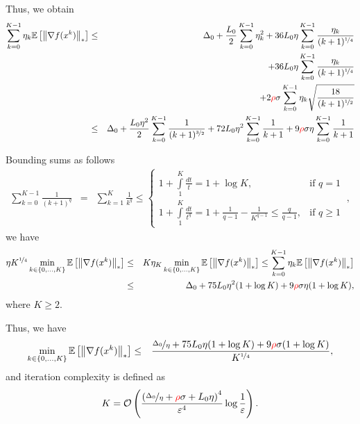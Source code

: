 \documentclass{article}
\begin{document}
Thus, we obtain 
\begin{eqnarray*}
    \sum_{k=0}^{K-1} \eta_k {\mathbb{E}}\left[\left\| \nabla f(x^k) \right\|_*\right] &\le& \Delta_0  +\frac{L_0}{2}\sum^{K-1}_{k=0}\eta_k^2 + 36L_0\eta\sum^{K-1}_{k=0}\frac{\eta_k}{(k+1)^{\nicefrac{1}{4}}}\\
    && + 36L_0\eta\sum^{K-1}_{k=0}\frac{\eta_k}{(k+1)^{\nicefrac{1}{4}}}\\
    && + 2{\color{red} \rho} \sigma\sum^{K-1}_{k=0}\eta_k\sqrt{\frac{18}{(k+1)^{\nicefrac{1}{2}}}}\\
    &\le& \Delta_0  +\frac{L_0\eta^2}{2}\sum^{K-1}_{k=0}\frac{1}{(k+1)^{\nicefrac{3}{2}}} + 72 L_0\eta^2 \sum^{K-1}_{k=0}\frac{1}{k+1} + 9 {\color{red} \rho} \sigma \eta \sum^{K-1}_{k=0}\frac{1}{k+1}
\end{eqnarray*}

Bounding sums as follows 
\begin{eqnarray*}
    \sum^{K-1}_{k = 0} \frac{1}{(k+1)^q} &=& \sum^{K}_{k = 1}  \frac{1}{k^q} \le \begin{cases}
        1 + \int\limits^{K}_1 \frac{dt}{t} = 1+  \log K, & \text{if } q =1\\ 
        1 + \int\limits^{K}_1 \frac{dt}{t^q} = 1+  \frac{1}{q-1} - \frac{1}{K^{q-1}} \leq \frac{q}{q-1}, & \text{if } q \geq 1\
    \end{cases},
\end{eqnarray*}
we have 
\begin{eqnarray*}
    \eta K^{\nicefrac{1}{4}}\min_{k \in \{0, \dots, K\}}{\mathbb{E}}\left[\left\| \nabla f(x^k) \right\|_*\right] &\le& K\eta_K \min_{k \in \{0, \dots, K\}}{\mathbb{E}}\left[\left\| \nabla f(x^k) \right\|_*\right] \le \sum_{k=0}^{K-1} \eta_k {\mathbb{E}}\left[\left\| \nabla f(x^k) \right\|_*\right] \\
    &\le& \Delta_0   + 75 L_0\eta^2 (1+\log K) + 9 {\color{red} \rho} \sigma \eta (1+\log K) ,
\end{eqnarray*}
where $K\ge 2$.

Thus, we have 
\begin{eqnarray*}
    \min_{k \in \{0, \dots, K\}}{\mathbb{E}}\left[\left\| \nabla f(x^k) \right\|_*\right] 
    &\le& \frac{\nicefrac{\Delta_0 }{\eta}  + 75 L_0\eta (1+\log K) + 9 {\color{red} \rho} \sigma  (1+\log K)}{ K^{\nicefrac{1}{4}}},
\end{eqnarray*}
 and iteration complexity is defined as 
 \begin{equation*}
    K = \mathcal{O}\left(\frac{\left(\nicefrac{\Delta_0 }{\eta} + {\color{red} \rho} \sigma +  L_0\eta\right)^4 }{\varepsilon^4}\log \frac{1}{\varepsilon}\right).
 \end{equation*}
\end{document}
